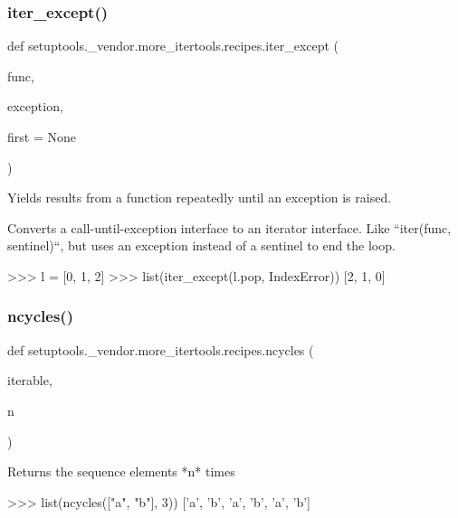 \subsubsection{\texorpdfstring{iter\+\_\+except()}{iter\_except()}}
{\footnotesize\ttfamily def setuptools.\+\_\+vendor.\+more\+\_\+itertools.\+recipes.\+iter\+\_\+except (\begin{DoxyParamCaption}\item[{}]{func,  }\item[{}]{exception,  }\item[{}]{first = {\ttfamily None} }\end{DoxyParamCaption})}

\begin{DoxyVerb}Yields results from a function repeatedly until an exception is raised.

Converts a call-until-exception interface to an iterator interface.
Like ``iter(func, sentinel)``, but uses an exception instead of a sentinel
to end the loop.

    >>> l = [0, 1, 2]
    >>> list(iter_except(l.pop, IndexError))
    [2, 1, 0]\end{DoxyVerb}
 \mbox{\label{namespacesetuptools_1_1__vendor_1_1more__itertools_1_1recipes_a7de4140cecda3a2c9af5c746eb0b68d7}} 
\subsubsection{\texorpdfstring{ncycles()}{ncycles()}}
{\footnotesize\ttfamily def setuptools.\+\_\+vendor.\+more\+\_\+itertools.\+recipes.\+ncycles (\begin{DoxyParamCaption}\item[{}]{iterable,  }\item[{}]{n }\end{DoxyParamCaption})}

\begin{DoxyVerb}Returns the sequence elements *n* times

>>> list(ncycles(["a", "b"], 3))
['a', 'b', 'a', 'b', 'a', 'b']\end{DoxyVerb}
 \mbox{\label{namespacesetuptools_1_1__vendor_1_1more__itertools_1_1recipes_a0c91334b79933102bd1c9ec06d966745}} 
